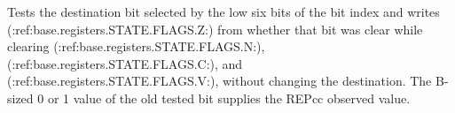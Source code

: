 Tests the destination bit selected by the low six bits of the bit index and writes (:ref:base.registers.STATE.FLAGS.Z:) from whether that bit was clear while clearing (:ref:base.registers.STATE.FLAGS.N:), (:ref:base.registers.STATE.FLAGS.C:), and (:ref:base.registers.STATE.FLAGS.V:), without changing the destination. The B-sized 0 or 1 value of the old tested bit supplies the REPcc observed value.
